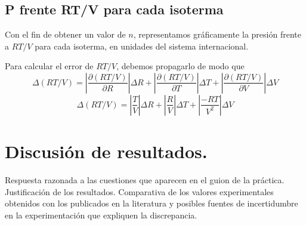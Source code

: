 \documentclass[a4paper,12pt,spanish]{article}
\begin{document}
	
	\iffalse
	Cada gráfica deberá contener un pie de gráfica con una breve
	explicación de la misma. Para cada representación gráfica, se debe incluir en el
	informe una tabla con los datos representados, así como las columnas
	correspondientes a las incertidumbres, ya sean de medidas directas, o por
	propagación de incertidumbres en el caso de medidas indirectas (con esto básicamente tengo que repetir datos pero supongo que tiene sentido). Los ejes de las
	gráficas deben presentar la magnitud representada junto con sus unidades. Elegir
	una escala de los ejes proporcionada respecto al intervalo de datos a representar.
	Cada punto de la gráfica debe mostrar sus correspondientes barras de
	incertidumbre. Cuando se haya realizado un ajuste por mínimos cuadrados de los
	datos, presentar la ecuación de la recta, la incertidumbre de la pendiente y de la
	ordenada en el origen, así como el coeficiente de correlación.
	\fi
	
	
	\subsection{P frente RT/V para cada isoterma}
	
	Con el fin de obtener un valor de $n$, representamos gráficamente la presión frente a $RT/V$ para cada isoterma, en unidades del sistema internacional.
	
	Para calcular el error de $RT/V$, debemos propagarlo de modo que 
	\[ \Delta (RT/V) = \left|\frac{\partial (RT/V)}{\partial R}\right|\Delta R +\left|\frac{\partial(RT/V) }{\partial T}\right|\Delta T +\left|\frac{\partial(RT/V) }{\partial V}\right|\Delta V
		\]
	\[ \Delta (RT/V) = \left|\frac{T}{V}\right|\Delta R +\left|\frac{R}{V}\right|\Delta T +\left|\frac{-RT }{V^2}\right|\Delta V
	 \]
	
	
	
	
	
	
	

	
	\section{Discusión de resultados.}
	
	\iffalse
	Respuesta razonada a las cuestiones que aparecen en el
	guion de la práctica. Justificación de los resultados. Comparativa de los valores
	experimentales obtenidos con los publicados en la literatura y posibles fuentes de
	incertidumbre en la experimentación que expliquen la discrepancia.
	
\end{document}
